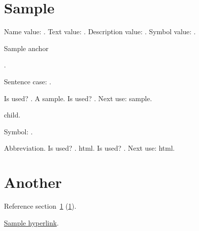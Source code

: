 \documentclass{article}
\begin{document}
\tableofcontents

\section{Sample}
\label{sec:sample}
Name value: .
Text value: .
Description value: .
Symbol value: .

\hypertarget{sampleanchor}{Sample anchor}.

Sentence case: .

Is used? .
A \gls{sample}.
Is used? .
Next use: \gls{sample}.

\Gls{child}.

Symbol: .

Abbreviation. 
Is used? .
\gls{html}.
Is used? .
Next use: \gls{html}.

\section{Another}
\label{sec:another}

Reference section~\ref{sec:sample} (\ref*{sec:sample}).

\hyperlink{sampleanchor}{Sample hyperlink}.

\printunsrtglossaries
\end{document}

